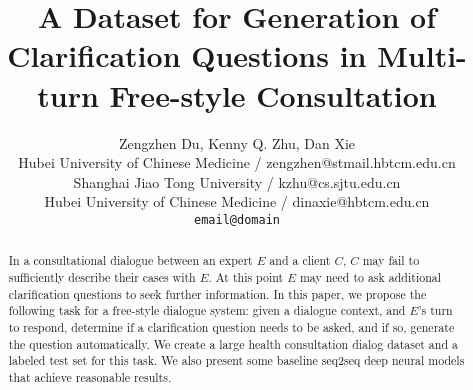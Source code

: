 \documentclass[11pt,a4paper]{article}
\title{A Dataset for Generation of Clarification Questions in Multi-turn Free-style Consultation}
\author{Zengzhen Du, Kenny Q. Zhu, Dan Xie \\
Hubei University of Chinese Medicine / zengzhen@stmail.hbtcm.edu.cn \\
Shanghai Jiao Tong University / kzhu@cs.sjtu.edu.cn \\
Hubei University of Chinese Medicine / dinaxie@hbtcm.edu.cn \\
\texttt{email@domain} \\\And
}
\date{}
\begin{document}
\maketitle
\begin{abstract}
In a consultational dialogue between an expert $E$ and a client $C$, $C$ may fail to
sufficiently describe their cases with $E$. At this point $E$ may need to ask additional
clarification questions to seek further information. In this paper, we propose the following
task for a free-style dialogue system: given a dialogue context, and $E$'s turn to respond,
determine if a clarification question needs to be asked, and if so, 
generate the question automatically. We create a large health consultation dialog dataset
and a labeled test set for this task. We also present some baseline
seq2seq deep neural models that achieve reasonable results.
\end{abstract}







	


	
\end{document}
